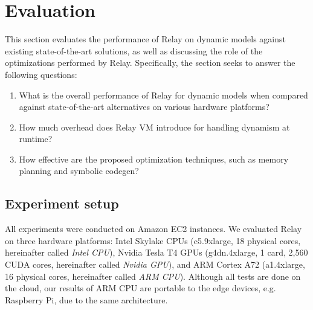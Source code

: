     \section{Evaluation}
    \label{sec:eval}

    This section evaluates the performance of Relay on dynamic models against existing state-of-the-art solutions, as well as discussing the role of the optimizations performed by Relay. Specifically, the section seeks to answer the following questions:
    \begin{enumerate}
        \item What is the overall performance of Relay for dynamic models when compared against state-of-the-art alternatives on various hardware platforms?
        \item How much overhead does Relay VM introduce for handling dynamism at runtime?
        \item How effective are the proposed optimization techniques, such as memory planning and symbolic codegen?
    \end{enumerate}

    \subsection{Experiment setup}
    \label{sec:eval:setup}

    All experiments were conducted on Amazon EC2 instances. We evaluated Relay on three hardware platforms: Intel Skylake CPUs (c5.9xlarge, 18 physical cores, hereinafter called {\em Intel CPU}), Nvidia Tesla T4 GPUs (g4dn.4xlarge, 1 card, 2,560 CUDA cores, hereinafter called {\em Nvidia GPU}), and ARM Cortex A72 (a1.4xlarge, 16 physical cores, hereinafter called {\em ARM CPU}). Although all tests are done on the cloud, our results of ARM CPU are portable to the edge devices, e.g. Raspberry Pi, due to the same architecture. %

